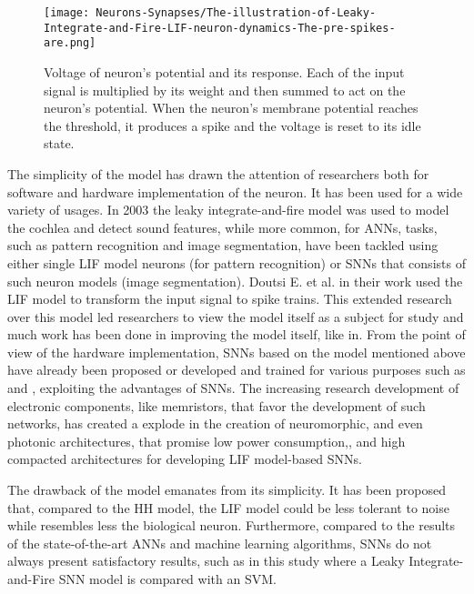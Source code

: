 \documentclass[12pt]{report}
\begin{document}
\begin{figure}[htp]
    \centering
    \texttt{[image: Neurons-Synapses/The-illustration-of-Leaky-Integrate-and-Fire-LIF-neuron-dynamics-The-pre-spikes-are.png]}
    \caption{Voltage of neuron's potential and its response. Each of the input signal is multiplied by its weight and then summed to act on the neuron's potential. When the neuron's membrane potential reaches the threshold, it produces a spike and the voltage is reset to its idle state.}
    \label{fig:lif-neuron}
\end{figure}

\medskip

The simplicity of the model has drawn the attention of researchers both for software and hardware implementation of the neuron. It has been used for a wide variety of usages. In 2003 the leaky integrate-and-fire model was used to model the cochlea and detect sound features\cite{sound2003}, while more common, for ANNs, tasks, such as pattern recognition and image segmentation, have been tackled using either single LIF model neurons (for pattern recognition)\cite{pattern2007} or SNNs that consists of such neuron models (image segmentation)\cite{Chaturvedi2012}. Doutsi E. et al. in their work\cite{Doutsi2021} used the LIF model to transform the input signal to spike trains. This extended research over this model led researchers to view the model itself as a subject for study and much work has been done in improving the model itself, like in\cite{Mullowney2008}. From the point of view of the hardware implementation, SNNs based on the model mentioned above have already been proposed or developed and trained for various purposes such as\cite{Liu2019} and \cite{Chu2015}, exploiting the advantages of SNNs. The increasing research development of electronic components, like memristors, that favor the development of such networks\cite{Yang2020}, has created a explode in the creation of neuromorphic, and even photonic architectures\cite{Nahmias2013}, that promise low power consumption\cite{Liu2019},\cite{Chatterjee2019}, and high compacted architectures\cite{Rozenberg2019} for developing LIF model-based SNNs. 

The drawback of the model emanates from its simplicity. It has been proposed that, compared to the HH model, the LIF model could be less tolerant to noise while resembles less the biological neuron\cite{subthreshold2005}. Furthermore, compared to the results of the state-of-the-art ANNs and machine learning algorithms, SNNs do not always present satisfactory results, such as in this study\cite{SVM2014} where a Leaky Integrate-and-Fire SNN model is compared with an SVM.
\end{document}
